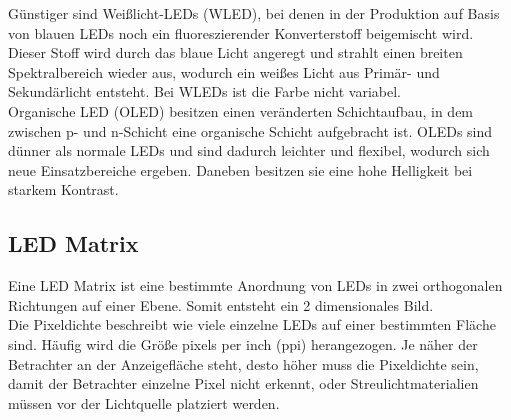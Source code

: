 Günstiger sind Weißlicht-LEDs (WLED), bei denen in der Produktion auf Basis von blauen LEDs noch ein fluoreszierender Konverterstoff beigemischt wird. Dieser Stoff wird durch das blaue Licht angeregt und strahlt einen breiten Spektralbereich wieder aus, wodurch ein weißes Licht aus Primär- und Sekundärlicht entsteht. Bei WLEDs ist die Farbe nicht variabel. \cite[Vgl. Seite 194]{LofflerMang.2020} \\
Organische LED (OLED) besitzen einen veränderten Schichtaufbau, in dem zwischen p- und n-Schicht eine organische Schicht aufgebracht ist. OLEDs sind dünner als normale LEDs und sind dadurch leichter und flexibel, wodurch sich neue Einsatzbereiche ergeben. Daneben besitzen sie eine hohe Helligkeit bei starkem Kontrast. \cite[Vgl. Seite 195]{LofflerMang.2020}
\subsection{LED Matrix}
Eine LED Matrix ist eine bestimmte Anordnung von LEDs in zwei orthogonalen Richtungen auf einer Ebene. Somit entsteht ein 2 dimensionales Bild.\\ 
Die Pixeldichte beschreibt wie viele einzelne LEDs auf einer bestimmten Fläche sind. Häufig wird die Größe \glqq pixels per inch \grqq{} (ppi) herangezogen. Je näher der Betrachter an der Anzeigefläche steht, desto höher muss die Pixeldichte sein, damit der Betrachter einzelne Pixel nicht erkennt, oder Streulichtmaterialien müssen vor der Lichtquelle platziert werden.
